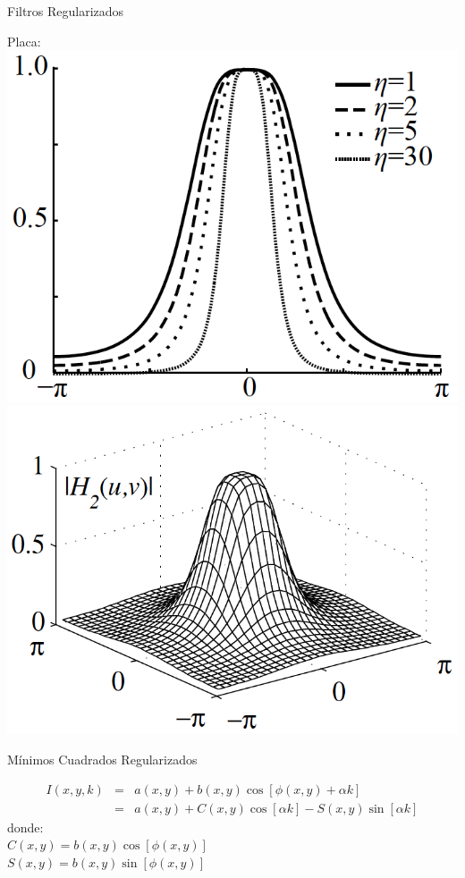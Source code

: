\documentclass[]{beamer}
\begin{document}
\begin{frame}{Filtros Regularizados}
\begin{center}

Placa:\\
\includegraphics[scale=0.45]{Images/FrecuenciaPlaca.png}
\includegraphics[scale=0.45]{Images/FrecuenciaPlaca3D.png}

\end{center}
\end{frame}
\begin{frame}{M\'inimos Cuadrados Regularizados}
\begin{center}

\begin{eqnarray}
  I(x,y,k) &=& a(x,y) + b(x,y)\cos[\phi(x,y) +\alpha k] \nonumber \\
  &=& a(x,y) + C(x,y)\cos[\alpha k] - S(x,y)\sin[\alpha k]
\end{eqnarray}
donde:\\
$C(x,y)=b(x,y)\cos[\phi(x,y)]$ \\ 
$S(x,y)=b(x,y)\sin[\phi(x,y)]$\\


\end{center}
\end{frame}
\end{document}
